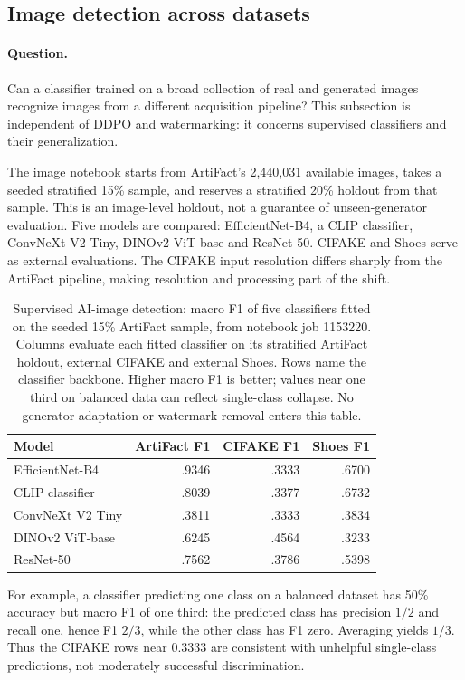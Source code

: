 \subsection{Image detection across datasets}
\label{sec:image_bench}
\paragraph{Question.} Can a classifier trained on a broad collection of real and generated images recognize images from a different acquisition pipeline? This subsection is independent of DDPO and watermarking: it concerns supervised classifiers and their generalization.

The image notebook starts from ArtiFact's 2,440,031 available images, takes a seeded stratified 15\% sample, and reserves a stratified 20\% holdout from that sample. This is an image-level holdout, not a guarantee of unseen-generator evaluation. Five models are compared: EfficientNet-B4, a CLIP classifier, ConvNeXt V2 Tiny, DINOv2 ViT-base and ResNet-50. CIFAKE and Shoes serve as external evaluations. The CIFAKE input resolution differs sharply from the ArtiFact pipeline, making resolution and processing part of the shift.

\begin{table}[ht]\centering\small
\begin{tabular}{lrrr}\toprule
Model & ArtiFact F1 & CIFAKE F1 & Shoes F1\\\midrule
EfficientNet-B4 & .9346 & .3333 & .6700\\
CLIP classifier & .8039 & .3377 & .6732\\
ConvNeXt V2 Tiny & .3811 & .3333 & .3834\\
DINOv2 ViT-base & .6245 & .4564 & .3233\\
ResNet-50 & .7562 & .3786 & .5398\\\bottomrule
\end{tabular}
\caption{Supervised AI-image detection: macro F1 of five classifiers fitted on the seeded 15\% ArtiFact sample, from notebook job 1153220. Columns evaluate each fitted classifier on its stratified ArtiFact holdout, external CIFAKE and external Shoes. Rows name the classifier backbone. Higher macro F1 is better; values near one third on balanced data can reflect single-class collapse. No generator adaptation or watermark removal enters this table.}
\end{table}

For example, a classifier predicting one class on a balanced dataset has 50\% accuracy but macro F1 of one third: the predicted class has precision $1/2$ and recall one, hence F1 $2/3$, while the other class has F1 zero. Averaging yields $1/3$. Thus the CIFAKE rows near 0.3333 are consistent with unhelpful single-class predictions, not moderately successful discrimination.

